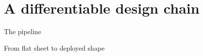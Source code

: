 \documentclass[aspectratio=169,11pt]{beamer}
\begin{document}
\section{A differentiable design chain}
\sectionslide{}

%
\begin{frame}{The pipeline}
\end{frame}

%
\begin{frame}{From flat sheet to deployed shape}
\end{frame}
\end{document}
